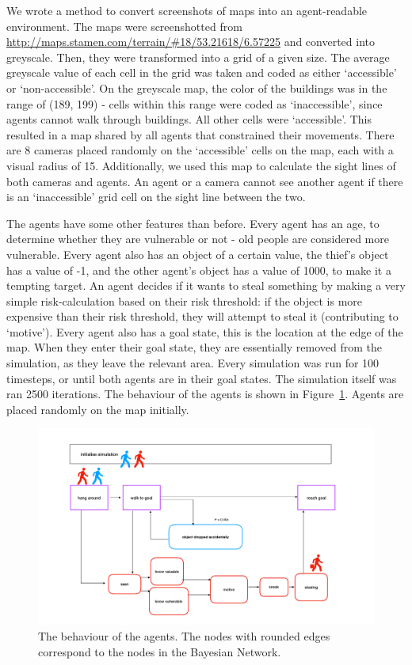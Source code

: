 We wrote a method to convert screenshots of maps into an agent-readable environment. The maps were screenshotted from \url{http://maps.stamen.com/terrain/#18/53.21618/6.57225} and converted into greyscale. Then, they were transformed into a grid of a given size. The average greyscale value of each cell in the grid was taken and coded as either `accessible' or `non-accessible'. On the greyscale map, the color of the buildings was in the range of (189, 199) - cells within this range were coded as `inaccessible', since agents cannot walk through buildings. All other cells were `accessible'. This resulted in a map shared by all agents that constrained their movements. There are 8 cameras placed randomly on the `accessible' cells on the map, each with a visual radius of 15. Additionally, we used this map to calculate the sight lines of both cameras and agents. An agent or a camera cannot see another agent if there is an `inaccessible' grid cell on the sight line between the two.

The agents have some other features than before. Every agent has an age, to determine whether they are vulnerable or not - old people are considered more vulnerable. Every agent also has an object of a certain value, the thief's object has a value of -1, and the other agent's object has a value of 1000, to make it a tempting target. An agent decides if it wants to steal something by making a very simple risk-calculation based on their risk threshold: if the object is more expensive than their risk threshold, they will attempt to steal it (contributing to `motive'). Every agent also has a goal state, this is the location at the edge of the map. When they enter their goal state, they are essentially removed from the simulation, as they leave the relevant area. Every simulation was run for 100 timesteps, or until both agents are in their goal states. The simulation itself was ran 2500 iterations. The behaviour of the agents is shown in Figure~\ref{behaviourGM}. Agents are placed randomly on the map initially.


\begin{figure}[htbp]
\begin{center}
\includegraphics[width=\linewidth]{images/grotemarkt.pdf}
\end{center}
\caption{The behaviour of the agents. The nodes with rounded edges correspond to the nodes in the Bayesian Network.}
\label{behaviourGM}
\end{figure}

